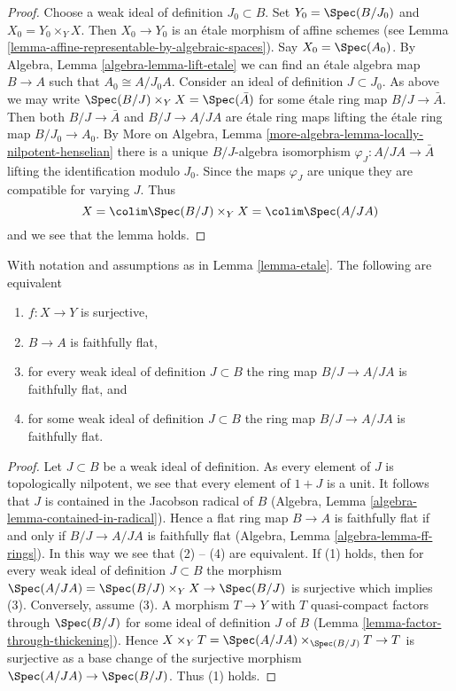 \begin{proof}
Choose a weak ideal of definition $J_0 \subset B$. Set
$Y_0 = \Spec(B/J_0)$ and $X_0 = Y_0 \times_Y X$. Then $X_0 \to Y_0$
is an \'etale morphism of affine schemes (see
Lemma \ref{lemma-affine-representable-by-algebraic-spaces}).
Say $X_0 = \Spec(A_0)$. By Algebra, Lemma \ref{algebra-lemma-lift-etale}
we can find an \'etale algebra map $B \to A$ such that
$A_0 \cong A/J_0A$. Consider an ideal of definition $J \subset J_0$.
As above we may write $\Spec(B/J) \times_Y X = \Spec(\bar A)$
for some \'etale ring map $B/J \to \bar A$. Then both
$B/J \to \bar A$ and $B/J \to A/JA$ are \'etale ring maps
lifting the \'etale ring map $B/J_0 \to A_0$. By
More on Algebra, Lemma \ref{more-algebra-lemma-locally-nilpotent-henselian}
there is a unique $B/J$-algebra isomorphism
$\varphi_J : A/JA \to \bar A$ lifting the identification modulo $J_0$.
Since the maps $\varphi_J$ are unique they are compatible for varying $J$.
Thus
$$
X = \colim \Spec(B/J) \times_Y X = \colim \Spec(A/JA)
$$
and we see that the lemma holds.
\end{proof}

\begin{lemma}
\label{lemma-etale-surjective}
With notation and assumptions as in Lemma \ref{lemma-etale}.
The following are equivalent
\begin{enumerate}
\item $f : X \to Y$ is surjective,
\item $B \to A$ is faithfully flat,
\item for every weak ideal of definition $J \subset B$
the ring map $B/J \to A/JA$ is faithfully flat, and
\item for some weak ideal of definition $J \subset B$
the ring map $B/J \to A/JA$ is faithfully flat.
\end{enumerate}
\end{lemma}

\begin{proof}
Let $J \subset B$ be a weak ideal of definition. As every element of $J$
is topologically nilpotent, we see that every element of $1 + J$ is
a unit. It follows that $J$ is contained in the Jacobson radical of $B$
(Algebra, Lemma \ref{algebra-lemma-contained-in-radical}).
Hence a flat ring map $B \to A$ is faithfully flat if and only if
$B/J \to A/JA$ is faithfully flat
(Algebra, Lemma \ref{algebra-lemma-ff-rings}).
In this way we see that (2) -- (4) are equivalent.
If (1) holds, then for every weak ideal of definition $J \subset B$
the morphism
$\Spec(A/JA) = \Spec(B/J) \times_Y X \to \Spec(B/J)$ is surjective
which implies (3). Conversely, assume (3).
A morphism $T \to Y$ with $T$ quasi-compact
factors through $\Spec(B/J)$ for some ideal of definition $J$ of $B$
(Lemma \ref{lemma-factor-through-thickening}).
Hence $X \times_Y T = \Spec(A/JA) \times_{\Spec(B/J)} T \to T$
is surjective as a base change of the surjective morphism
$\Spec(A/JA) \to \Spec(B/J)$. Thus (1) holds.
\end{proof}





